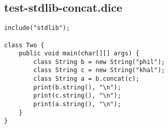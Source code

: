 \subsection{test-stdlib-concat.dice}
\begin{verbatim}
include("stdlib");

class Two {
	public void main(char[][] args) {
        class String b = new String("phil");
        class String c = new String("khal");
        class String a = b.concat(c);
        print(b.string(), "\n");
        print(c.string(), "\n");
        print(a.string(), "\n");
	}
}

\end{verbatim}